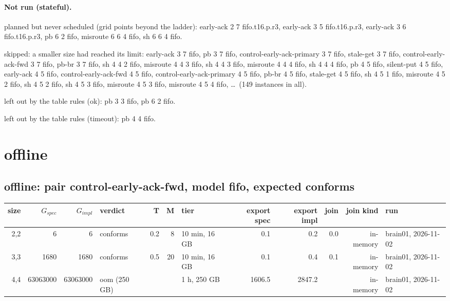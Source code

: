 \documentclass[10pt]{article}
\begin{document}
\paragraph{Not run (stateful).}
planned but never scheduled (grid points beyond the ladder): early-ack 2 7 fifo.t16.p.r3, early-ack 3 5 fifo.t16.p.r3, early-ack 3 6 fifo.t16.p.r3, pb 6 2 fifo, misroute 6 6 4 fifo, sh 6 6 4 fifo.\par
skipped: a smaller size had reached its limit: early-ack 3 7 fifo, pb 3 7 fifo, control-early-ack-primary 3 7 fifo, stale-get 3 7 fifo, control-early-ack-fwd 3 7 fifo, pb-br 3 7 fifo, sh 4 4 2 fifo, misroute 4 4 3 fifo, sh 4 4 3 fifo, misroute 4 4 4 fifo, sh 4 4 4 fifo, pb 4 5 fifo, silent-put 4 5 fifo, early-ack 4 5 fifo, control-early-ack-fwd 4 5 fifo, control-early-ack-primary 4 5 fifo, pb-br 4 5 fifo, stale-get 4 5 fifo, sh 4 5 1 fifo, misroute 4 5 2 fifo, sh 4 5 2 fifo, sh 4 5 3 fifo, misroute 4 5 3 fifo, misroute 4 5 4 fifo, \ldots\ (149 instances in all).\par
left out by the table rules (ok): pb 3 3 fifo, pb 6 2 fifo.\par
left out by the table rules (timeout): pb 4 4 fifo.\par
\section*{offline}
\subsection*{offline: pair \textsf{control-early-ack-fwd}, model fifo, expected conforms}
\begin{longtable}{@{}rrrlrrlrrrrl@{}}
\toprule
size & $G_{\mathit{spec}}$ & $G_{\mathit{impl}}$ & verdict & T & M & tier & export spec & export impl & join & join kind & run \\
\midrule
\endhead
\color{red} 2,2 & 6 & 6 & conforms & 0.2 & 8 & 10 min, 16 GB & 0.1 & 0.2 & 0.0 & in-memory & brain01, 2026-11-02 \\
\color{red} 3,3 & 1680 & 1680 & conforms & 0.5 & 20 & 10 min, 16 GB & 0.1 & 0.4 & 0.1 & in-memory & brain01, 2026-11-02 \\
\color{red} 4,4 & 63063000 & 63063000 & oom (250 GB) &  &  & 1 h, 250 GB & 1606.5 & 2847.2 &  & in-memory & brain01, 2026-11-02 \\
\bottomrule
\end{longtable}
\end{document}
